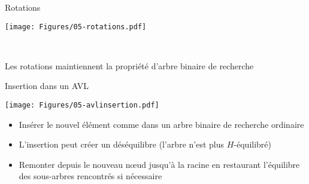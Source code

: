 \begin{frame}{Rotations}

\centerline{\texttt{[image: Figures/05-rotations.pdf]}}

\bigskip

\begin{center}
~~~~~~~~~~~~~~~~~~~
\end{center}

Les rotations maintiennent la propriété d'arbre binaire  de recherche

\end{frame}

\begin{frame}{Insertion dans un AVL}

\centerline{\texttt{[image: Figures/05-avlinsertion.pdf]}}

\bigskip

\begin{itemize}
\item Insérer le nouvel élément comme dans un arbre binaire de recherche ordinaire
\item L'insertion peut créer un déséquilibre (l'arbre n'est plus $H$-équilibré)
\item Remonter depuis le nouveau n\oe ud jusqu'à la racine en
  restaurant l'équilibre des sous-arbres rencontrés si nécessaire
\end{itemize}


\end{frame}

